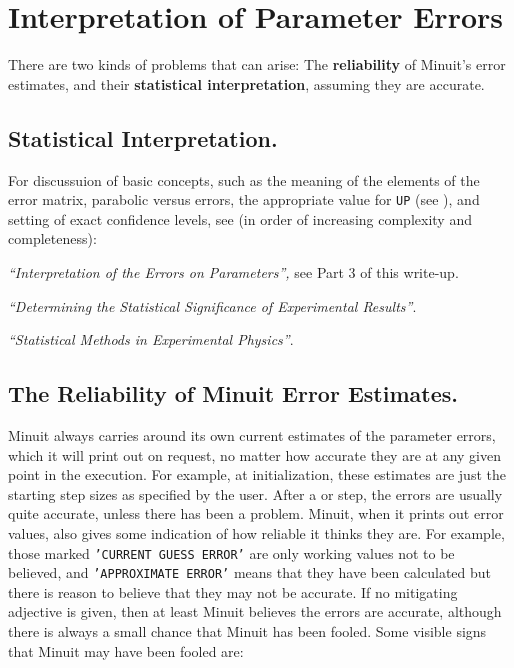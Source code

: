 \section{Interpretation of Parameter Errors}

There are two kinds of problems that can arise:
The {\bf reliability} of Minuit's error estimates, and their
{\bf statistical interpretation}, assuming they are accurate.

\subsection{Statistical Interpretation.}

For discussuion of basic concepts, such as the meaning of the elements
of the error matrix, parabolic versus  errors,
the appropriate value for \texttt{UP} 
(see ), and setting of exact
confidence levels, see (in order of increasing complexity and completeness):

\begin{UL}            
\item {\em ``Interpretation of the Errors on Parameters'',}
      see Part 3 of this write-up.
\item {\em ``Determining the Statistical Significance of Experimental
      Results''}\cite{bib-MIN81}.
\item {\em ``Statistical Methods in Experimental Physics''}\cite{bib-EADIE}.
\end{UL}

\subsection{The Reliability of Minuit Error Estimates.}

Minuit always carries around its own current estimates of the
parameter errors, which it will print out on request, no matter how
accurate they are at any given point in the execution.
For example, at initialization, these estimates are just the starting
step sizes as specified by the user.  
After a  or  step,
the errors are usually quite accurate, unless there has been a problem.
Minuit, when it prints out error values,
also gives some indication of how reliable it thinks they are.
For example, those marked \texttt{'CURRENT GUESS ERROR'} are only working values
not to be believed, and \texttt{'APPROXIMATE ERROR'} means that they have been
calculated but there is reason to believe that they may not be accurate.
If no mitigating adjective is given, then at least Minuit believes
the errors are accurate, although there is always a small chance
that Minuit has been fooled.
Some visible signs that Minuit may have been fooled are:

